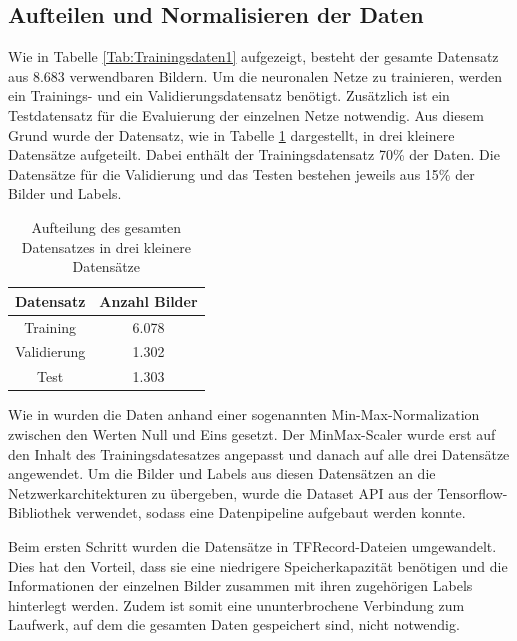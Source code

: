 \subsection{Aufteilen und Normalisieren der Daten}
Wie in Tabelle \ref{Tab:Trainingsdaten1} aufgezeigt, besteht der gesamte Datensatz aus 8.683 verwendbaren Bildern. Um die neuronalen Netze zu trainieren, werden ein Trainings- und ein Validierungsdatensatz benötigt. Zusätzlich ist ein Testdatensatz für die Evaluierung der einzelnen Netze notwendig. Aus diesem Grund wurde der Datensatz, wie in Tabelle \ref{Tab:train-val-test-tabelle} dargestellt, in drei kleinere Datensätze aufgeteilt. Dabei enthält der Trainingsdatensatz 70{\%} der Daten. Die Datensätze für die Validierung und das Testen bestehen jeweils aus 15{\%} der Bilder und Labels. 

\begin{table}[h!]
\begin{center}
\begin{tabular}{cc}
\textbf{Datensatz}   & \textbf{Anzahl Bilder} \\ \hline
Training    & 6.078         \\
Validierung & 1.302         \\
Test        & 1.303        
\end{tabular}
\caption{Aufteilung des gesamten Datensatzes in drei kleinere Datensätze}
\label{Tab:train-val-test-tabelle}
\end{center}
\end{table}

\mypar Wie in \cite{jo2019effectiveness} wurden die Daten anhand einer sogenannten Min-Max-Normalization zwischen den Werten Null und Eins gesetzt. Der MinMax-Scaler wurde erst auf den Inhalt des Trainingsdatesatzes angepasst und danach auf alle drei Datensätze angewendet. Um die Bilder und Labels aus diesen Datensätzen an die Netzwerkarchitekturen zu übergeben, wurde die Dataset API aus der Tensorflow-Bibliothek \cite{abadi2016tensorflow} verwendet, sodass eine Datenpipeline aufgebaut werden konnte.

\mypar Beim ersten Schritt wurden die Datensätze in TFRecord-Dateien umgewandelt. Dies hat den Vorteil, dass sie eine niedrigere Speicherkapazität benötigen und die Informationen der einzelnen Bilder zusammen mit ihren zugehörigen Labels hinterlegt werden. Zudem ist somit eine ununterbrochene Verbindung zum Laufwerk, auf dem die gesamten Daten gespeichert sind, nicht notwendig.

